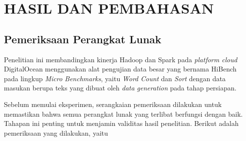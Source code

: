 \chapter{HASIL DAN PEMBAHASAN}

\section{Pemeriksaan Perangkat Lunak}
Penelitian ini membandingkan kinerja Hadoop dan Spark pada \textit{platform cloud} DigitalOcean menggunakan alat pengujian data besar yang bernama HiBench pada lingkup \textit{Micro Benchmarks}, yaitu \textit{Word Count} dan \textit{Sort} dengan data masukan berupa teks yang dibuat oleh \textit{data generation} pada tahap persiapan. 

Sebelum memulai eksperimen, serangkaian pemeriksaan dilakukan untuk memastikan bahwa semua perangkat lunak yang terlibat berfungsi dengan baik. Tahapan ini penting untuk menjamin validitas hasil penelitian. Berikut adalah pemeriksaan yang dilakukan, yaitu
